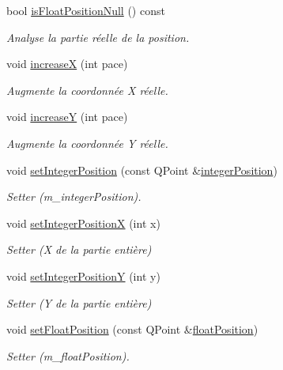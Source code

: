 \begin{DoxyCompactItemize}
bool \hyperlink{class_double_position_a8531d86338f04961d875ee903adb9ec0}{is\+Float\+Position\+Null} () const 
\begin{DoxyCompactList}\small\item\em Analyse la partie réelle de la position. \end{DoxyCompactList}\item 
void \hyperlink{class_double_position_a9865b0c4bb41f8337d0063443d2edc7e}{increase\+X} (int pace)
\begin{DoxyCompactList}\small\item\em Augmente la coordonnée X réelle. \end{DoxyCompactList}\item 
void \hyperlink{class_double_position_a6b26f1e3875571911cecbcec20760193}{increase\+Y} (int pace)
\begin{DoxyCompactList}\small\item\em Augmente la coordonnée Y réelle. \end{DoxyCompactList}\item 
void \hyperlink{class_double_position_ab96be3ead7159a7e736bdf96f73cfbdc}{set\+Integer\+Position} (const Q\+Point \&\hyperlink{class_double_position_afc3276b37b2cca9d982f4773b35a450a}{integer\+Position})
\begin{DoxyCompactList}\small\item\em Setter (m\+\_\+integer\+Position). \end{DoxyCompactList}\item 
void \hyperlink{class_double_position_a0af7282f24900a3106ae324ca12c5def}{set\+Integer\+Position\+X} (int x)
\begin{DoxyCompactList}\small\item\em Setter (X de la partie entière) \end{DoxyCompactList}\item 
void \hyperlink{class_double_position_a513c186fb02d0b6549e7c80ece398a2b}{set\+Integer\+Position\+Y} (int y)
\begin{DoxyCompactList}\small\item\em Setter (Y de la partie entière) \end{DoxyCompactList}\item 
void \hyperlink{class_double_position_ae1730ae16bcc3365d2d3edfbaa66045c}{set\+Float\+Position} (const Q\+Point \&\hyperlink{class_double_position_aa5b3aff5c9c95efefb3f9625ec514fa0}{float\+Position})
\begin{DoxyCompactList}\small\item\em Setter (m\+\_\+float\+Position). \end{DoxyCompactList}\item 

\end{DoxyCompactItemize}
